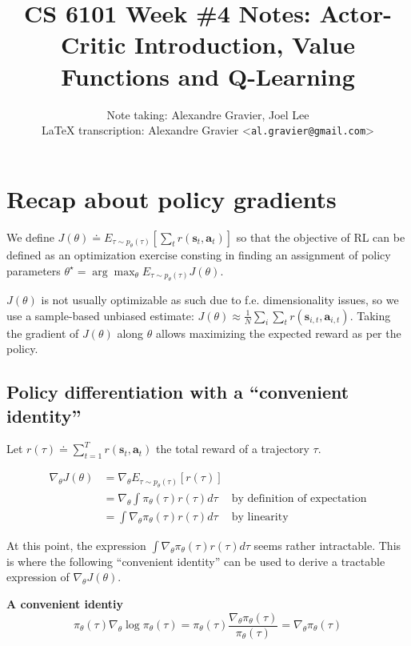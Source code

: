 \documentclass{article}
\title{CS 6101 Week \#4 Notes: Actor-Critic Introduction, Value Functions and Q-Learning}
\author{
  Note taking: Alexandre Gravier, Joel Lee\\
  \LaTeX{} transcription: Alexandre Gravier <\texttt{al.gravier@gmail.com}> \\
}
\begin{document}
\maketitle

\tableofcontents

\section{Recap about policy gradients}


We define $J(\theta) \doteq E_{\tau\sim p_\theta(\tau)}\left[\sum_t r\left(\mathbf{s}_t,\mathbf{a}_t\right)\right]$ so that the objective of RL can be defined as an optimization exercise consting in finding an assignment of policy parameters $\theta^\star = \arg\max_\theta E_{\tau\sim p_\theta(\tau)}J(\theta)$.

$J(\theta)$ is not usually optimizable as such due to f.e. dimensionality issues, so we
use a sample-based unbiased estimate: $J(\theta) \approx \frac{1}{N} \sum_i \sum_t r\left(\mathbf{s}_{i,t},\mathbf{a}_{i,t}\right)$. Taking the gradient of $J(\theta)$ along $\theta$ allows maximizing the expected reward as per the policy.

\subsection{Policy differentiation with a ``convenient identity''}

Let $r(\tau) \doteq \sum_{t=1}^T r\left(\mathbf{s}_t,\mathbf{a}_t\right)$ the total reward of a trajectory $\tau$.

\begin{subequations}
  \begin{align}
    \nabla_\theta J(\theta) 
      &= \nabla_\theta E_{\tau\sim p_\theta(\tau)}[r(\tau)] & \\
      &= \nabla_\theta\int\pi_\theta(\tau) r(\tau)d\tau &\text{by definition of expectation}\\ 
      &= \int\nabla_\theta\pi_\theta(\tau) r(\tau)d\tau &\text{by linearity} \label{eq:gradjintegral}
  \end{align}
\end{subequations}

At this point, the expression $\int\nabla_\theta\pi_\theta(\tau) r(\tau)d\tau$ seems rather intractable. This is where the following ``convenient identity'' can be used to derive a tractable expression of $\nabla_\theta J(\theta)$.

\begin{shaded}
  \textbf{A convenient identiy}
  \begin{equation} \label{eq:convenientidentity}
    \pi_\theta (\tau)\nabla_\theta \log \pi_\theta (\tau) = \pi_\theta (\tau) \frac{\nabla_\theta \pi_\theta (\tau)}{\pi_\theta (\tau)} = \nabla_\theta \pi_\theta (\tau)
  \end{equation}
\end{shaded}
\end{document}
